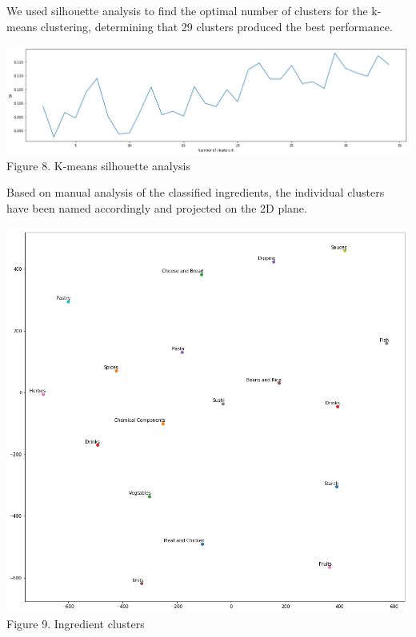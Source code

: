 \documentclass[11pt]{article}
\begin{document}
We used silhouette analysis to find the optimal number of clusters for the k-means clustering, determining that 29 clusters produced the best performance.

\vspace{5mm}
\begin{center}
\includegraphics[scale=0.18]{ingredient-kmeans}
\label{ingredient-kmeans} Figure 8. K-means silhouette analysis
\end{center}
\vspace{5mm}

Based on manual analysis of the classified ingredients, the individual clusters have been named accordingly and projected on the 2D plane.

\vspace{5mm}
\begin{center}
\includegraphics[scale=0.24]{ingredient-clusters}
\label{ingredient-clusters} Figure 9. Ingredient clusters
\end{center}
\vspace{5mm}
\end{document}
